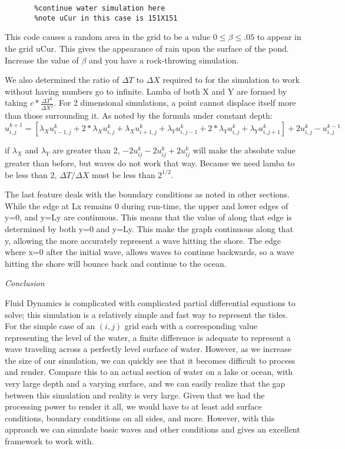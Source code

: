 \documentclass[12pt]{article}
\begin{document}
\begin{enumerate}
{\begin{verbatim}
       %continue water simulation here
       %note uCur in this case is 151X151
\end{verbatim}

This code causes a random area in the grid to be a value $0 \leq \beta \leq .05$ to appear in the grid uCur.  This gives the appearance of rain upon the surface of the pond.  Increase the value of $\beta$ and you have a rock-throwing simulation.


We also determined the ratio of $\Delta T$ to $\Delta X$ required to for the simulation to work without having numbers go to infinite. Lamba of both X and Y are formed by taking $ c*\frac{\Delta T^2}{\Delta X^2} $. For 2 dimensional simulations, a point cannot displace itself more than those surrounding it. As noted by the formula under constant depth:
\[u_{i,j}^{k+1} = [\lambda_X u_{i-1,j}^k + 2*\lambda_X u_{i,j}^k + \lambda_X u_{i+1,j}^k + \lambda_Y u_{i,j-1}^k + 2*\lambda_Y u_{i,j}^k + \lambda_Y u_{i,j+1}^k] + 2 u_{i,j}^k - u_{i,j}^{k-1}\]

\normalsize{if $\lambda_X$ and $\lambda_Y$ are greater than 2, $-2u^k_{ij}-2u^k_{ij}+2u^k_{ij}$ will make the absolute value greater than before, but waves do not work that way. Because we need lamba to be less than 2, $\Delta T/\Delta X$ must be less than $2^{1/2}$.

The last feature deals with the boundary conditions as noted in other sections. While the edge at Lx remains 0 during run-time, the upper and lower edges of y=0, and y=Ly are continuous. This means that the value of along that edge is determined by both y=0 and y=Ly. This make the graph continuous along that y, allowing the more accurately represent a wave hitting the shore. The edge where x=0 after the initial wave, allows waves to continue backwards, so a wave hitting the shore will bounce back and continue to the ocean.}

\large{\item\textit{Conclusion}}

\normalsize{Fluid Dynamics is complicated with complicated partial differential equations to solve; this simulation is a relatively simple and fast way to represent the tides.  For the simple case of an $(i,j)$ grid each with a corresponding value representing the level of the water, a finite difference is adequate to represent a wave traveling across a perfectly level surface of water.  However, as we increase the size of our simulation, we can quickly see that it becomes difficult to process and render.  Compare this to an actual section of water on a lake or ocean, with very large depth and a varying surface, and we can easily realize that the gap between this simulation and reality is very large.  Given that we had the processing power to render it all, we would have to at least add surface conditions, boundary conditions on all sides, and more.  However, with this approach we can simulate basic waves and other conditions and gives an excellent framework to work with.}

}
\end{enumerate}
\end{document}

